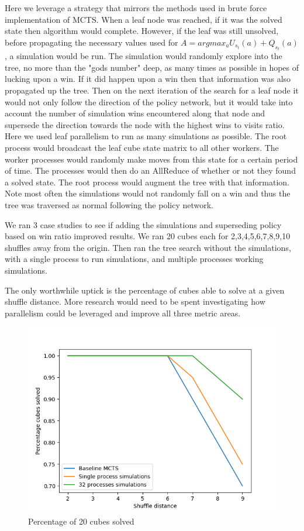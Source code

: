 \documentclass[10pt,twocolumn,letterpaper]{article}
\begin{document}
Here we leverage a strategy that mirrors the methods used in brute force implementation of MCTS.  When a leaf node was reached, if it was the solved state then algorithm would complete.  However, if the leaf was still unsolved, before propagating the necessary values used for $A=argmax_a U_{s_{t}}(a) + Q_{s_{t}}(a) $, a simulation would be run.  The simulation would randomly explore into the tree, no more than the "gods number" deep, as many times as possible in hopes of lucking upon a win.  If it did happen upon a win then that information was also propagated up the tree.  Then on the next iteration of the search for a leaf node it would not only follow the direction of the policy network, but it would take into account the number of simulation wins encountered along that node and supersede the direction towards the node with the highest wins to visits ratio.  Here we used leaf parallelism to run as many simulations as possible.  The root process would broadcast the leaf cube state matrix to all other workers.  The worker processes would randomly make moves from this state for a certain period of time.  The processes would then do an AllReduce of whether or not they found a solved state.  The root process would augment the tree with that information.  Note most often the simulations would not randomly fall on a win and thus the tree was traversed as normal following the policy network. 

We ran 3 case studies to see if adding the simulations and superseding policy based on win ratio improved results.  We ran 20 cubes each for 2,3,4,5,6,7,8,9,10 shuffles away from the origin.  Then ran the tree search without the simulations, with a single process to run simulations, and multiple processes working simulations. 

The only worthwhile uptick is the percentage of cubes able to solve at a given shuffle distance.  More research would need to be spent investigating how parallelism could be leveraged and improve all three metric areas.  

\begin{figure}
  \includegraphics[width=\linewidth]{para_solved.png}
  \caption{Percentage of 20 cubes solved}
  \label{fig:net}
\end{figure}
\end{document}
